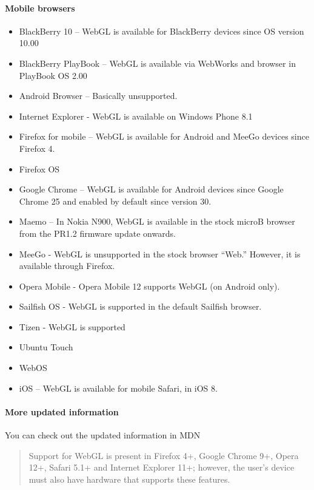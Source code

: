 \documentclass[]{article}
\begin{document}
\paragraph{Mobile browsers}\label{mobile-browsers}

\begin{itemize}
\itemsep1pt\parskip0pt
\item
  BlackBerry 10 -- WebGL is available for BlackBerry devices since OS
  version 10.00
\item
  BlackBerry PlayBook -- WebGL is available via WebWorks and browser in
  PlayBook OS 2.00
\item
  Android Browser -- Basically unsupported.
\item
  Internet Explorer - WebGL is available on Windows Phone 8.1
\item
  Firefox for mobile -- WebGL is available for Android and MeeGo devices
  since Firefox 4.
\item
  Firefox OS
\item
  Google Chrome -- WebGL is available for Android devices since Google
  Chrome 25 and enabled by default since version 30.
\item
  Maemo -- In Nokia N900, WebGL is available in the stock microB browser
  from the PR1.2 firmware update onwards.
\item
  MeeGo - WebGL is unsupported in the stock browser ``Web.'' However, it
  is available through Firefox.
\item
  Opera Mobile - Opera Mobile 12 supports WebGL (on Android only).
\item
  Sailfish OS - WebGL is supported in the default Sailfish browser.
\item
  Tizen - WebGL is supported
\item
  Ubuntu Touch
\item
  WebOS
\item
  iOS -- WebGL is available for mobile Safari, in iOS 8.
\end{itemize}

\paragraph{More updated information}\label{more-updated-information}

You can check out the updated information in MDN \cite{webglmdn}

\begin{quote}
Support for WebGL is present in Firefox 4+, Google Chrome 9+, Opera 12+,
Safari 5.1+ and Internet Explorer 11+; however, the user's device must
also have hardware that supports these features.
\end{quote}
\end{document}
